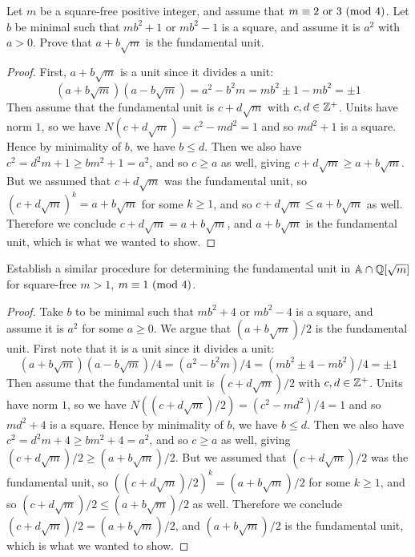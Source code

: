 \documentclass[11pt]{article}
\begin{document}
Let $m$ be a square-free positive integer, and assume that $m \equiv 2 \text{ or } 3\ (\text{mod}\ 4)$.
Let $b$ be minimal such that $mb^2+1$ or $mb^2-1$ is a square, and assume it is $a^2$ with $a > 0$.
Prove that $a + b\sqrt{m}$ is the fundamental unit.

\begin{proof}
  First, $a+b\sqrt{m}$ is a unit since it divides a unit:
  \begin{equation*}
    (a+b\sqrt{m})(a-b\sqrt{m})
    = a^2 - b^2m = mb^2 \pm 1 - mb^2 = \pm 1
  \end{equation*}
  Then assume that the fundamental unit is $c + d\sqrt{m}$ with $c,d \in \mathbb{Z}^+$.
  Units have norm $1$, so we have $N(c+d\sqrt{m}) = c^2 - md^2 = 1$ and so $md^2 + 1$ is a square.
  Hence by minimality of $b$, we have $b \le d$.
  Then we also have $c^2 = d^2m + 1 \ge bm^2 + 1 = a^2$, and so $c \ge a$ as well, giving $c + d\sqrt{m} \ge a + b\sqrt{m}$.
  But we assumed that $c + d\sqrt{m}$ was the fundamental unit, so $(c+d\sqrt{m})^k = a + b\sqrt{m}$ for some $k \ge 1$, and so $c + d\sqrt{m} \le a + b\sqrt{m}$ as well.
  Therefore we conclude $c + d\sqrt{m} = a + b\sqrt{m}$, and $a + b\sqrt{m}$ is the fundamental unit, which is what we wanted to show.
\end{proof}

Establish a similar procedure for determining the fundamental unit in $\mathbb{A} \cap \mathbb{Q}[\sqrt{m}]$ for square-free $m > 1$, $m \equiv 1\ (\text{mod}\ 4)$.

\begin{proof}
  Take $b$ to be minimal such that $mb^2+4$ or $mb^2-4$ is a square, and assume it is $a^2$ for some $a \ge 0$.
  We argue that $(a + b\sqrt{m})/2$ is the fundamental unit.
  First note that it is a unit since it divides a unit:
  \begin{equation*}
    (a+b\sqrt{m})(a-b\sqrt{m})/4
    = (a^2 - b^2m)/4 = (mb^2 \pm 4 - mb^2)/4 = \pm 1
  \end{equation*}
  Then assume that the fundamental unit is $(c + d\sqrt{m})/2$ with $c,d \in \mathbb{Z}^+$.
  Units have norm $1$, so we have $N((c+d\sqrt{m})/2) = (c^2 - md^2)/4 = 1$ and so $md^2 + 4$ is a square.
  Hence by minimality of $b$, we have $b \le d$.
  Then we also have $c^2 = d^2m + 4 \ge bm^2 + 4 = a^2$, and so $c \ge a$ as well, giving $(c + d\sqrt{m})/2 \ge (a + b\sqrt{m})/2$.
  But we assumed that $(c + d\sqrt{m})/2$ was the fundamental unit, so $((c+d\sqrt{m})/2)^k = (a + b\sqrt{m})/2$ for some $k \ge 1$, and so $(c + d\sqrt{m})/2 \le (a + b\sqrt{m})/2$ as well.
  Therefore we conclude $(c + d\sqrt{m})/2 = (a + b\sqrt{m})/2$, and $(a + b\sqrt{m})/2$ is the fundamental unit, which is what we wanted to show.
\end{proof}
\end{document}
